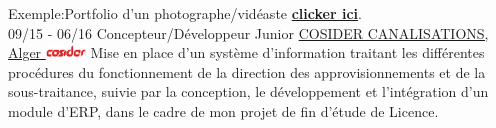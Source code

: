 \documentclass[]{friggeri-cv}
\begin{document}
\begin{entrylist}
{    Exemple:Portfolio d'un photographe/vidéaste \href{http://www.abafann.com/}{\textbf{clicker ici}}.\\}
  \entry
    {09/15 - 06/16}
    {Concepteur/Développeur Junior}
    {\href{http://www.cosider-groupe.dz/fr/cosider-canalisations}{COSIDER CANALISATIONS, Alger \includegraphics[width=30pt]{images/cosider.png}}}
    {Mise en place d'un système d'information traitant les différentes procédures du fonctionnement de la direction des approvisionnements et de la sous-traitance, suivie par la conception, le développement et l'intégration d'un module d'ERP, dans le cadre de mon projet de fin d'étude de Licence.\\}
  
\end{entrylist}

\newpage
\end{document}
